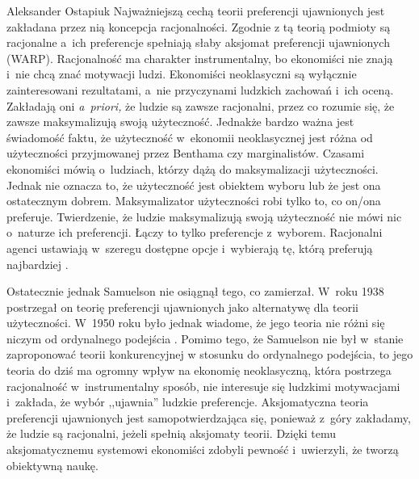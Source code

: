 \begin{artplenv}{Aleksander Ostapiuk}
Najważniejszą cechą teorii preferencji ujawnionych jest zakładana przez nią koncepcja racjonalności.
Zgodnie z tą teorią podmioty są racjonalne a~ich preferencje spełniają słaby aksjomat preferencji ujawnionych (WARP).
Racjonalność ma charakter instrumentalny, bo ekonomiści nie znają i~nie chcą znać motywacji ludzi. Ekonomiści
neoklasyczni są wyłącznie zainteresowani rezultatami, a~nie przyczynami ludzkich zachowań i~ich oceną. Zakładają oni
\textit{a~priori,} że ludzie są zawsze racjonalni, przez co rozumie się, że zawsze maksymalizują swoją użyteczność. Jednakże
bardzo ważna jest świadomość faktu, że użyteczność w~ekonomii neoklasycznej jest różna od użyteczności przyjmowanej
przez Benthama czy marginalistów. Czasami ekonomiści mówią o~ludziach, którzy dążą do maksymalizacji użyteczności.
Jednak nie oznacza to, że użyteczność jest obiektem wyboru lub że jest ona ostatecznym dobrem. Maksymalizator
użyteczności robi tylko to, co on/ona preferuje. Twierdzenie, że ludzie maksymalizują swoją użyteczność nie mówi
nic o~naturze ich preferencji. Łączy to tylko preferencje z~wyborem. Racjonalni agenci ustawiają w~szeregu dostępne
opcje i~wybierają tę, którą preferują najbardziej
\parencite[s.~18]{hausman_inexact_1992}.

Ostatecznie jednak Samuelson nie osiągnął tego, co zamierzał. W~roku 1938 postrzegał on teorię preferencji ujawnionych
jako alternatywę dla teorii użyteczności. W~1950 roku było jednak wiadome, że jego teoria nie różni się niczym od
ordynalnego podejścia
\parencite{wong_foundations_2006}.
Pomimo tego, że Samuelson nie był w~stanie
zaproponować teorii konkurencyjnej w stosunku do ordynalnego podejścia, to jego teoria do dziś ma ogromny wpływ na ekonomię
neoklasyczną, która postrzega racjonalność w~instrumentalny sposób, nie interesuje się ludzkimi motywacjami i~zakłada,
że wybór ,,ujawnia'' ludzkie preferencje. Aksjomatyczna teoria preferencji ujawnionych jest samopotwierdzająca się, ponieważ
z~góry zakładamy, że ludzie są racjonalni, jeżeli spełnią aksjomaty teorii. Dzięki temu aksjomatycznemu
systemowi ekonomiści zdobyli pewność i~uwierzyli, że tworzą obiektywną naukę. 


\end{artplenv}
